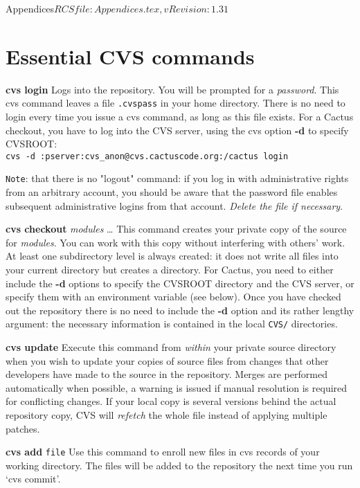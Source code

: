 \begin{cactuspart}{6}{Appendices}{$RCSfile: Appendices.tex,v $}{$Revision: 1.31 $}
\section{Essential CVS commands}

\begin{Lentry}
\item[{\bf cvs login}]
Logs into the repository. You will be prompted for a {\em
password}. This cvs command leaves a file {\tt .cvspass} in your
home directory. There is no need to login every time you issue a cvs
command, as long as this file exists. For a Cactus checkout, you have
to log into the CVS server, using the cvs option {\bf -d} to specify CVSROOT:\\
{\tt cvs -d :pserver:cvs\_anon@cvs.cactuscode.org:/cactus login}

{\tt Note}: that there is no "logout" command: if you log in with
administrative rights from an arbitrary account, you should be aware
that the password file enables subsequent administrative logins from
that account. {\em Delete the file if necessary}.

\item[{\bf cvs checkout} {\em modules} \ldots]
This command  creates
your private copy of the source for {\em modules}. You can work
with this copy  without  interfering  with  others'
work.   At  least  one subdirectory level is always created: it does
not write all files into your current directory but creates a
directory. For Cactus, you need to either include the {\bf -d} options to
specify the CVSROOT directory and the CVS server, or specify them
with an environment variable (see below). Once you
have checked out the repository there is no need to include the {\bf
-d} option and its rather lengthy argument: the necessary information
is contained in the local {\tt CVS/} directories.

\item[{\bf cvs update}]
Execute  this  command  from  {\it within}  your  private
source  directory  when  you  wish  to  update your
copies of source  files  from  changes  that  other
developers have made to the source in the repository.
Merges are performed automatically when possible, a warning is issued
if manual  resolution  is  required  for conflicting  changes. If your
local copy is several versions behind the actual repository copy, CVS
will {\em refetch} the whole file instead of applying multiple
patches.

\item[{\bf cvs add} {\tt file}]
Use this command to enroll new files in cvs records
of your working directory.  The files will be added
to the  repository  the  next  time  you  run  `cvs
commit'.


\end{Lentry}
\end{cactuspart}
